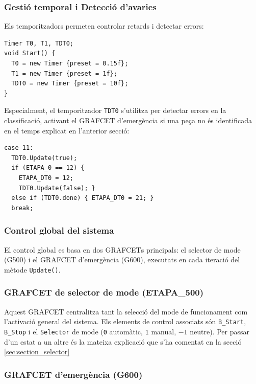 \documentclass[a4paper,11pt,DIV=13,headings=normal,abstract=true,twoside=semi]{article}
\newcommand{\acro}[1]{\textsc{#1}}
\begin{document}
\subsubsection*{Gestió temporal i Detecció d'avaries}

Els temporitzadors permeten controlar retards i detectar errors:

\begin{lstlisting}[style=simple]
Timer T0, T1, TDT0;
void Start() {
  T0 = new Timer {preset = 0.15f};
  T1 = new Timer {preset = 1f};
  TDT0 = new Timer {preset = 10f};
}
\end{lstlisting}

Especialment, el temporitzador \texttt{TDT0} s'utilitza per detectar errors en la classificació, activant el \acro{GRAFCET} d'emergència si una peça no és identificada en el temps explicat en l'anterior secció: 

\begin{lstlisting}[style=simple]
case 11:
  TDT0.Update(true);
  if (ETAPA_0 == 12) {
    ETAPA_DT0 = 12;
    TDT0.Update(false); }
  else if (TDT0.done) { ETAPA_DT0 = 21; }
  break;
\end{lstlisting}

\subsubsection{Control global del sistema}

El control global es basa en dos \acro{GRAFCET}s principals: el selector de mode (G500) i el \acro{GRAFCET} d'emergència (G600), executats en cada iteració del mètode \texttt{Update()}.

\subsubsection*{\acro{GRAFCET} de selector de mode (ETAPA\_500)}

Aquest \acro{GRAFCET} centralitza tant la selecció del mode de funcionament com l'activació general del sistema. Els elements de control associats són \texttt{B\_Start}, \texttt{B\_Stop}  i el \texttt{Selector} de mode (\texttt{0} automàtic, \texttt{1} manual, \texttt{$-1$} neutre). Per passar d'un estat a un altre és la mateixa explicació que s'ha comentat en la secció \ref{sec:section_selector}

\subsubsection*{\acro{GRAFCET} d'emergència (G600)}
\end{document}
